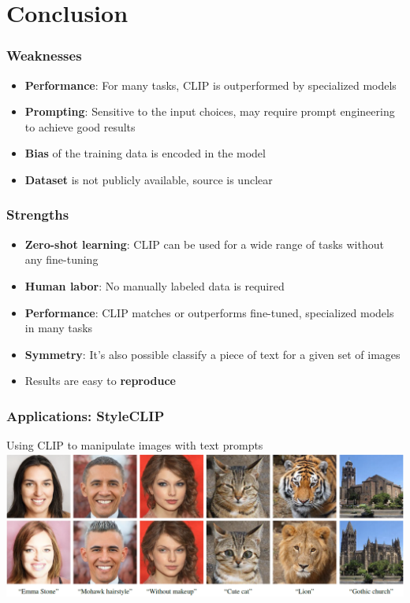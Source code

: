 \section{Conclusion}

\begin{frame}
    \frametitle{Weaknesses}
    \begin{itemize}
        \item<1-> \textbf{Performance}: For many tasks, CLIP is outperformed by specialized models
        \item<2-> \textbf{Prompting}: Sensitive to the input choices, may require prompt engineering to achieve good results
        \item<3-> \textbf{Bias} of the training data is encoded in the model
        \item<4-> \textbf{Dataset} is not publicly available, source is unclear
    \end{itemize}
\end{frame}

\begin{frame}
    \frametitle{Strengths}
    \begin{itemize}
        \item<1-> \textbf{Zero-shot learning}: CLIP can be used for a wide range of tasks without any fine-tuning
        \item<2-> \textbf{Human labor}: No manually labeled data is required
        \item<3-> \textbf{Performance}: CLIP matches or outperforms fine-tuned, specialized models in many tasks
        \item<5-> \textbf{Symmetry}: It's also possible classify a piece of text for a given set of images
        \item<6-> Results are easy to \textbf{reproduce}
    \end{itemize}
\end{frame}

\begin{frame}
    \frametitle{Applications: StyleCLIP}
    Using CLIP to manipulate images with text prompts 
    \includegraphics[width=\textwidth]{./images/teaser}
\end{frame}

